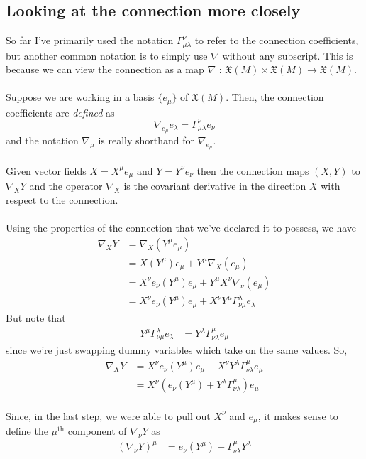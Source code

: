 \documentclass[11pt]{article}
\begin{document}
\vskip 1cm
\subsection{Looking at the connection more closely}
So far I've primarily used the notation $\Gamma_{\mu \lambda}^{\nu}$ to refer to the connection coefficients, but another common notation is to simply use $\nabla$ without any subscript. This is because we can view the connection as a map $\nabla \text{ : } \mathfrak{X}(M) \times \mathfrak{X}(M) \rightarrow \mathfrak{X}(M)$.
\\
\\
Suppose we are working in a basis $\{e_{\mu}\}$ of $\mathfrak{X}(M)$. Then, the connection coefficients are \emph{defined} as 
\[ \nabla_{e_{\mu}} e_{\lambda} = \Gamma_{\mu \lambda}^{\nu} e_{\nu} \]
and the notation $\nabla_{\mu}$ is really shorthand for $\nabla_{e_{\mu}}$.
\\
\\
Given vector fields $X = X^{\mu} e_{\mu}$ and $Y = Y^{\nu} e_{\nu}$ then the connection maps $(X, Y)$ to $\nabla_{X} Y$ and the operator $\nabla_X$ is the covariant derivative in the direction $X$ with respect to the connection.
\\
\\
Using the properties of the connection that we've declared it to possess, we have 
\begin{align*}
  \nabla_X Y &= \nabla_X \left(Y^{\mu} e_{\mu}\right) \\
  &= X(Y^{\mu})e_{\mu} + Y^{\mu} \nabla_X (e_{\mu}) \\
  &= X^{\nu} e_{\nu}(Y^{\mu})e_{\mu} + Y^{\mu} X^{\nu} \nabla_{\nu}(e_{\mu}) \\
  &= X^{\nu} e_{\nu}(Y^{\mu})e_{\mu} + X^{\nu} Y^{\mu} \Gamma_{\nu \mu}^{\lambda}e_{\lambda}
\end{align*}
But note that 
\begin{align*}
  Y^{\mu} \Gamma_{\nu \mu}^{\lambda} e_{\lambda} &= Y^{\lambda} \Gamma_{\nu \lambda}^{\mu} e_{\mu}
\end{align*}
since we're just swapping dummy variables which take on the same values. So,
\begin{align*}
  \nabla_X Y &= X^{\nu} e_{\nu}(Y^{\mu})e_{\mu} + X^{\nu} Y^{\lambda} \Gamma_{\nu \lambda}^{\mu} e_{\mu} \\
  &= X^{\nu} \left( e_{\nu}(Y^{\mu}) + Y^{\lambda} \Gamma_{\nu \lambda}^{\mu} \right) e_{\mu}
\end{align*}
\\
Since, in the last step, we were able to pull out $X^{\nu}$ and $e_{\mu}$, it makes sense to define the $\mu^{\text{th}}$ component of $\nabla_{\nu} Y$ as 
\begin{align*}
  (\nabla_{\nu} Y)^{\mu} &= e_{\nu}(Y^{\mu}) + \Gamma_{\nu \lambda}^{\mu} Y^{\lambda}
\end{align*}
\end{document}
